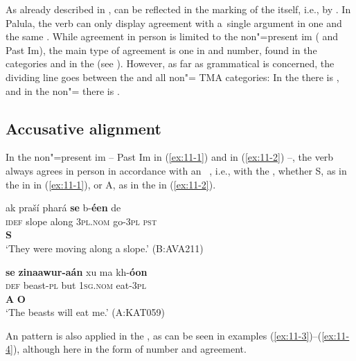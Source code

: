 As already described in ,  can be reflected in the marking of the  itself, i.e., by . In Palula, the verb can only display agreement with a~single argument in one and the same . While agreement in person is limited to the non"=present im ( and Past Im), the main type of agreement is one in  and number, found in the  categories and in the  (see ). However, as far as grammatical  is concerned, the dividing line goes between the  and all non"= TMA categories: In the  there is  , and in the non"= there is  . 


\subsection{Accusative alignment}
\label{subsec:11-1-1}


In the non"=present im -- Past Im in (\ref{ex:11-1}) and  in (\ref{ex:11-2}) --, the verb always agrees in person in accordance with an~ , i.e., with the , whether S, as in the in  in (\ref{ex:11-1}), or A, as in the   in (\ref{ex:11-2}). 

\begin{exe}
\ex
\label{ex:11-1}
\glll ak praší phará \textbf{se} b-\textbf{éen} de \\
\textsc{idef} slope along \textsc{3pl.nom} go-\textsc{3pl} \textsc{pst} \\
{} {} {}  \textbf{S} \\
\glt `They were moving along a slope.' (B:AVA211)

\ex
\label{ex:11-2}
\glll \textbf{se} \textbf{zinaawur-aán} xu ma kh-\textbf{óon} \\
\textsc{def} beast-\textsc{pl} but \textsc{1sg.nom} eat-\textsc{3pl} \\
 \textbf{A} {} {}  \textbf{O} \\
\glt `The beasts will eat me.' (A:KAT059)
\end{exe}

An  pattern is also applied in the , as can be seen in examples (\ref{ex:11-3})--(\ref{ex:11-4}), although here in the form of number and  agreement.

